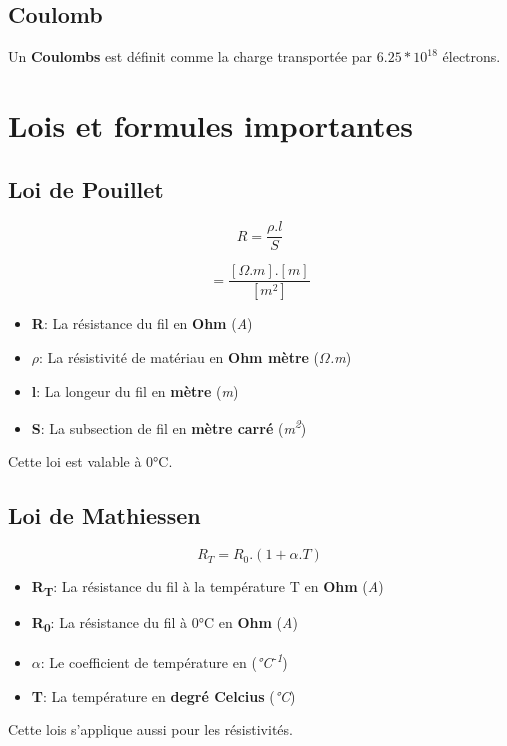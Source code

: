  \subsection{Coulomb}
 Un \textbf{Coulombs} est définit comme la charge transportée par \textbf{$6.25*10^{18}$} électrons.

 \section{Lois et formules importantes}

 \subsection{Loi de Pouillet}

 \begin{equation}
	 R=\frac{\rho.l}{S}
 \end{equation}

 \begin{equation}
	 [\Omega] = \frac{[\Omega.m].[m]}{[m^2]}
 \end{equation}

 \begin{itemize}
	 \item \textbf{R}: La résistance du fil en \textbf{Ohm} (\textit{A})
	 \item \textbf{$\rho$}: La résistivité de matériau en \textbf{Ohm mètre} (\textit{$\Omega$.m})
	 \item \textbf{l}: La longeur du fil en \textbf{mètre} (\textit{m})
	 \item \textbf{S}: La subsection de fil en \textbf{mètre carré} (\textit{m\textsuperscript{2}})
 \end{itemize}
 Cette loi est valable à 0°C.

 \subsection{Loi de Mathiessen}

 \begin{equation}
	 R_{T}=R_{0}.(1+\alpha.T)
 \end{equation}

 \begin{itemize}
	 \item \textbf{R\textsubscript{T}}: La résistance du fil à la température T en \textbf{Ohm} (\textit{A})
	 \item \textbf{R\textsubscript{0}}: La résistance du fil à 0°C en \textbf{Ohm} (\textit{A})
	 \item \textbf{$\alpha$}: Le coefficient de température en (\textit{°C\textsuperscript{-1}})
	 \item \textbf{T}: La température en \textbf{degré Celcius} (\textit{°C})
 \end{itemize}
 Cette lois s'applique aussi pour les résistivités.

